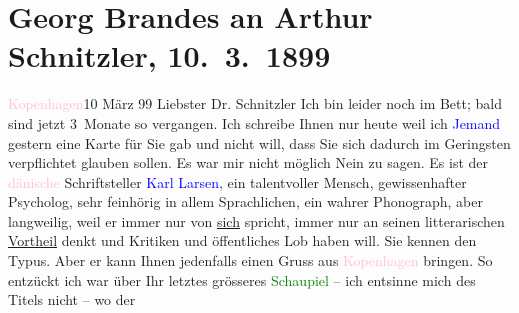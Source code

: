 

               \section[Georg Brandes an Arthur Schnitzler, 10. 3. 1899]{ Georg Brandes an Arthur Schnitzler, 10. 3. 1899}\nopagebreak{}\rehead{ }\normalsize\beginnumbering{} \toendnotes[C]{\smallbreak\pagebreak[2]} 
\toendnotes[C]{\smallbreak}\pstart
           \raggedleft{}{\pb}\textcolor{pink}{Kopenhagen}{}\ledrightnote{\textcolor{pink}{Kopenhagen}}{ }10 März 99\pend
           \pstart{}Liebster Dr. Schnitzler\pend\pstart
           Ich bin leider noch im Bett; bald sind jetzt 3 Monate so vergangen. Ich schreibe
               Ihnen nur heute weil ich \textcolor{blue}{Jemand}{}
               gestern eine Karte für Sie gab und nicht will, dass Sie sich dadurch im Geringsten
               verpflichtet glauben sollen. Es war mir nicht möglich Nein zu sagen. Es ist der \textcolor{pink}{dänische}{}\ledrightnote{\textcolor{pink}{Dänemark}} Schriftsteller \textcolor{blue}{Karl Larsen}{}\ledrightnote{\textcolor{blue}{Karl Larsen}}, ein talentvoller Mensch, gewissenhafter Psycholog,
               sehr feinhörig in allem Sprachlichen, ein wahrer Phonograph, aber langweilig, weil er
               immer nur von \uline{sich} spricht, immer nur an seinen
               litterarischen \uline{Vortheil} denkt und Kritiken und
               öffentliches Lob haben will. Sie kennen den Typus.\pend
           \pstart
           Aber er kann Ihnen jedenfalls einen {\pb}Gruss aus \textcolor{pink}{Kopenhagen}{}\ledrightnote{\textcolor{pink}{Kopenhagen}} bringen.\pend
           \pstart
           So entzückt ich war über Ihr letztes grösseres \textcolor{green}{Schaupiel}{} – ich entsinne mich des Titels nicht – wo der
